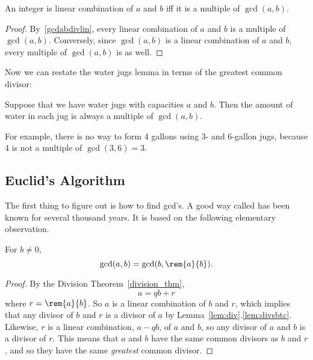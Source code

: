 \begin{editingnotes}
\begin{corollary}\label{cor:lin-comb-edit}
An integer is linear combination of $a$ and $b$ iff it is a multiple
of $\gcd(a, b)$.
\end{corollary}

\begin{proof} By~\eqref{gcdabdivlin}, every linear combination of $a$ and $b$ is a
multiple of $\gcd(a, b)$.  Conversely, since $\gcd(a, b)$ is a linear
combination of $a$ and $b$, every multiple of $\gcd(a, b)$ is as
well.  \end{proof}

Now we can restate the water jugs lemma in terms of the greatest
common divisor:

\begin{corollary} \label{cor:waterjugs_note} Suppose that we have water jugs with
capacities $a$ and $b$.  Then the amount of water in each jug is
always a multiple of $\gcd(a, b)$.
\end{corollary}

For example, there is no way to form 4 gallons using 3- and 6-gallon
jugs, because 4 is not a multiple of $\gcd(3, 6) = 3$.

\end{editingnotes}
\fi

\subsection{Euclid's Algorithm}\label{sec: Euclid}
The first thing to figure out is how to find gcd's.  A good way called  has been known for several thousand years.  It is based on the following
elementary observation.

\begin{lemma}\label{lem:gcdrem}
For $b \neq 0$,
\[
\gcd(a, b) = \gcd(b, \rem{a}{b}).
\]

\begin{proof}
By the Division Theorem~\ref{division_thm},
\begin{equation}\label{aqbrprf}
a = qb + r
\end{equation}
where $r = \rem{a}{b}$.  So $a$ is a linear combination of $b$ and
$r$, which implies that any divisor of $b$ and $r$ is a divisor of $a$
by Lemma~\ref{lem:div}.\ref{lem:divsbtc}.  Likewise, $r$ is a linear
combination, $a-qb$, of $a$ and $b$, so any divisor of $a$ and $b$ is
a divisor of $r$.  This means that $a$ and $b$ have the same common
divisors as $b$ and $r$, and so they have the same \emph{greatest}
common divisor.
\end{proof}
\end{lemma}

